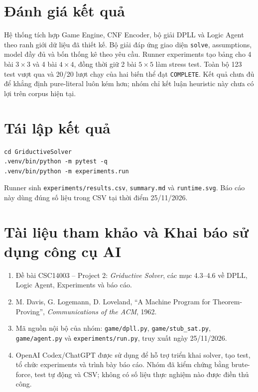 \documentclass[11pt,a4paper]{report}
\begin{document}
\section{Đánh giá kết quả}
Hệ thống tích hợp Game Engine, CNF Encoder, bộ giải DPLL và Logic Agent theo
ranh giới dữ liệu đã thiết kế. Bộ giải đáp ứng giao diện \texttt{solve},
assumptions, model đầy đủ và bốn thống kê theo yêu cầu. Runner experiments tạo
bảng cho 4 bài $3\times3$ và 4 bài $4\times4$, đồng thời giữ 2 bài
$5\times5$ làm stress test. Toàn bộ 123 test vượt qua và 20/20 lượt chạy của hai
biến thể đạt \texttt{COMPLETE}. Kết quả chưa đủ để khẳng định pure-literal luôn
kém hơn; nhóm chỉ kết luận heuristic này chưa có lợi trên corpus hiện tại.

\section{Tái lập kết quả}
\begin{lstlisting}[style=terminal]
cd GriductiveSolver
.venv/bin/python -m pytest -q
.venv/bin/python -m experiments.run
\end{lstlisting}
Runner sinh \texttt{experiments/results.csv}, \texttt{summary.md} và
\texttt{runtime.svg}. Báo cáo này dùng đúng số liệu trong CSV tại thời điểm
25/11/2026.

\section{Tài liệu tham khảo và Khai báo sử dụng công cụ AI}
\begingroup\footnotesize
\begin{enumerate}[leftmargin=1.5em,itemsep=1pt,topsep=2pt]
\footnotesize
\item Đề bài CSC14003 -- Project 2: \textit{Griductive Solver}, các mục
      4.3--4.6 về DPLL, Logic Agent, Experiments và báo cáo.
\item M. Davis, G. Logemann, D. Loveland, ``A Machine Program for
      Theorem-Proving'', \textit{Communications of the ACM}, 1962.
\item Mã nguồn nội bộ của nhóm: \texttt{game/dpll.py},
      \texttt{game/stub\_sat.py}, \texttt{game/agent.py} và
      \texttt{experiments/run.py}, truy xuất ngày 25/11/2026.
\item OpenAI Codex/ChatGPT được sử dụng để hỗ trợ triển khai solver, tạo test,
      tổ chức experiments và trình bày báo cáo. Nhóm đã kiểm chứng bằng
      brute-force, test tự động và CSV; không có số liệu thực nghiệm nào được
      điền thủ công.
\end{enumerate}
\endgroup
\end{document}
